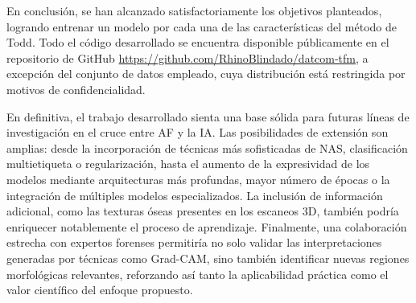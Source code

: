 En conclusión, se han alcanzado satisfactoriamente los objetivos planteados, logrando entrenar un modelo por cada una de las características del método de Todd. Todo el código desarrollado se encuentra disponible públicamente en el repositorio de GitHub \url{https://github.com/RhinoBlindado/datcom-tfm}, a excepción del conjunto de datos empleado, cuya distribución está restringida por motivos de confidencialidad.

En definitiva, el trabajo desarrollado sienta una base sólida para futuras líneas de investigación en el cruce entre AF y la IA. Las posibilidades de extensión son amplias: desde la incorporación de técnicas más sofisticadas de NAS, clasificación multietiqueta o regularización, hasta el aumento de la expresividad de los modelos mediante arquitecturas más profundas, mayor número de épocas o la integración de múltiples modelos especializados. La inclusión de información adicional, como las texturas óseas presentes en los escaneos 3D, también podría enriquecer notablemente el proceso de aprendizaje. Finalmente, una colaboración estrecha con expertos forenses permitiría no solo validar las interpretaciones generadas por técnicas como Grad-CAM, sino también identificar nuevas regiones morfológicas relevantes, reforzando así tanto la aplicabilidad práctica como el valor científico del enfoque propuesto.